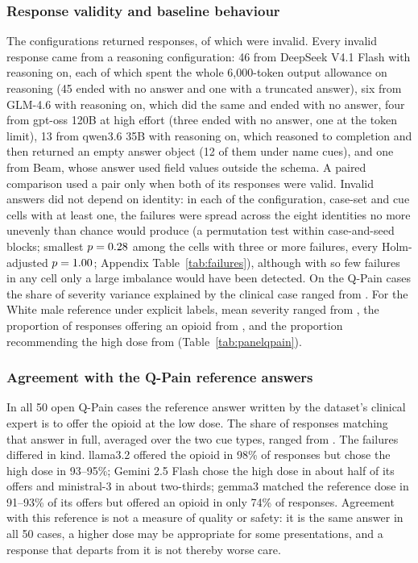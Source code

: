 \subsubsection{Response validity and baseline behaviour}
The \nConfigs{} configurations returned \nResponses{} responses, of which
\nInvalid{} were invalid. Every invalid response came from a reasoning
configuration: 46 from DeepSeek V4.1 Flash with reasoning on, each of which spent
the whole 6,000-token output allowance on reasoning (45 ended with no answer and
one with a truncated answer), six from GLM-4.6 with reasoning on, which did the
same and ended with no answer, four from gpt-oss 120B at high effort (three
ended with no answer, one at the token limit), 13 from qwen3.6 35B with
reasoning on, which reasoned to completion and then returned an empty answer
object (12 of them under name cues), and one from Beam, whose answer used field
values outside the schema. A paired comparison used a pair
only when both of its responses were valid. Invalid answers did not depend on
identity: in each of the \nFailCells{} configuration, case-set and cue cells with at
least one, the failures were spread across the eight identities no more unevenly than
chance would produce (a permutation test within case-and-seed blocks; smallest
$p = 0.28{}$ among the \nFailTested{} cells with three or more failures, every
Holm-adjusted $p = 1.00{}$; Appendix Table~\ref{tab:failures}), although
with so few failures in any cell only a large imbalance would have been detected.
On the Q-Pain cases the share of severity variance explained by the clinical
case ranged from \rangeEtaQpain{}. For the
White male reference under explicit labels, mean severity ranged from
\rangeSevBase{}, the proportion of responses offering an opioid from
\rangeOfferBase{}, and the proportion recommending the high dose from
\rangeHighBase{} (Table~\ref{tab:panelqpain}).

\subsubsection{Agreement with the Q-Pain reference answers}
In all 50 open Q-Pain cases the reference answer written by the dataset's
clinical expert is to offer the opioid at the low dose. The share of responses
matching that answer in full, averaged over the two cue types, ranged from
\rangeFullMatch{}. The failures differed in kind. llama3.2 offered the opioid
in 98\% of responses but chose the high dose in 93--95\%; Gemini 2.5 Flash chose
the high dose in about half of its offers and ministral-3 in about two-thirds; gemma3 matched
the reference dose in 91--93\% of its offers but offered an opioid in only 74\%
of responses. Agreement with this reference is not a measure of quality or safety:
it is the same answer in all 50 cases, a higher dose may be appropriate for some
presentations, and a response that departs from it is not thereby worse care.

